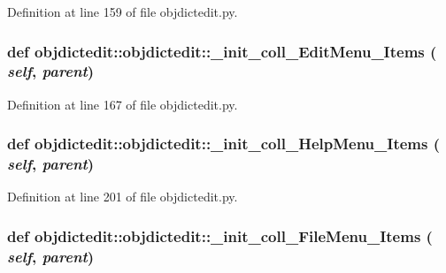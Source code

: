 Definition at line 159 of file objdictedit.py.\hypertarget{classobjdictedit_1_1objdictedit_ff8d7ea6744ddf274fc66869b0dd8d5d}{
\subsubsection[\_\-init\_\-coll\_\-EditMenu\_\-Items]{\setlength{\rightskip}{0pt plus 5cm}def objdictedit::objdictedit::\_\-init\_\-coll\_\-Edit\-Menu\_\-Items ( {\em self},  {\em parent})}}
\label{classobjdictedit_1_1objdictedit_ff8d7ea6744ddf274fc66869b0dd8d5d}




Definition at line 167 of file objdictedit.py.\hypertarget{classobjdictedit_1_1objdictedit_d939c47145a0e3275963bde016228f28}{
\subsubsection[\_\-init\_\-coll\_\-HelpMenu\_\-Items]{\setlength{\rightskip}{0pt plus 5cm}def objdictedit::objdictedit::\_\-init\_\-coll\_\-Help\-Menu\_\-Items ( {\em self},  {\em parent})}}
\label{classobjdictedit_1_1objdictedit_d939c47145a0e3275963bde016228f28}




Definition at line 201 of file objdictedit.py.\hypertarget{classobjdictedit_1_1objdictedit_8312a8842d9983e18f47e32cb66a4cbd}{
\subsubsection[\_\-init\_\-coll\_\-FileMenu\_\-Items]{\setlength{\rightskip}{0pt plus 5cm}def objdictedit::objdictedit::\_\-init\_\-coll\_\-File\-Menu\_\-Items ( {\em self},  {\em parent})}}
\label{classobjdictedit_1_1objdictedit_8312a8842d9983e18f47e32cb66a4cbd}




